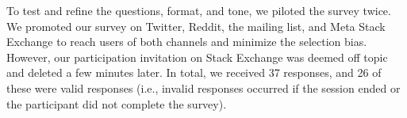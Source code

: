 To test and refine the questions, format, and tone, we piloted the survey twice. 
We promoted our survey on Twitter, Reddit, the \RH mailing list, and Meta Stack Exchange to reach users of both channels and minimize the selection bias. However, our participation invitation on Stack Exchange was deemed off topic and deleted a few minutes later. In total, we received 37 responses, and 26 of these were valid responses (i.e., invalid responses occurred if the session ended or the participant did not complete the survey).

